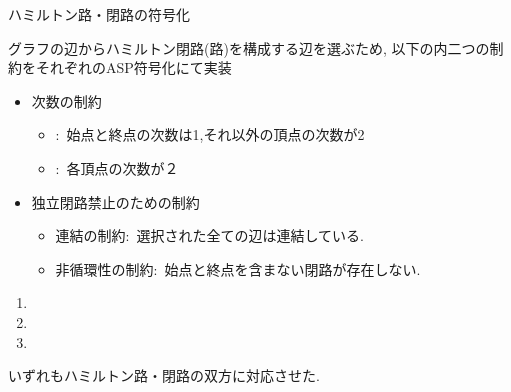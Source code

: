 \documentclass[dvipdfmx,11pt]{beamer}
\begin{document}
\begin{frame}[fragile]{ハミルトン路・閉路の符号化}
  \begin{block}{}
    グラフの辺からハミルトン閉路(路)を構成する辺を選ぶため,
    以下の内二つの制約をそれぞれのASP符号化にて実装
    \begin{itemize}
    \item \small{\alert{次数の制約}}
      \begin{itemize}
      \item \small{:\ 始点と終点の次数は1,それ以外の頂点の次数が2}        
      \item \small{:\ 各頂点の次数が２}
      \end{itemize}
    \item \small{独立閉路禁止のための制約}
      \begin{itemize}
      \item \small{\alert{連結の制約}:\ 選択された全ての辺は連結している.}
      \item \small{\alert{非循環性の制約}:\ 始点と終点を含まない閉路が存在しない.}
      \end{itemize}
    \end{itemize}
  \end{block}
  \begin{enumerate}
  \item {}
  \item {}
  \item {}
  \end{enumerate}
  いずれもハミルトン路・閉路の双方に対応させた.
\end{frame}
\newcommand{\grid}[2]{
    \draw (#1,#2) [fill=blue!20] circle[radius=0.5] node[at={(#1,#2)}]{1};
    \draw (#1,#2) circle[radius=0.5,shift={(1.5,0)}] node[at={(#1,#2)},shift={(1.5,0)}]{2};
    \draw (#1,#2) circle[radius=0.5,shift={(3.0,0)}] node[at={(#1,#2)},shift={(3.0,0)}]{3};
    \draw (#1,#2) circle[radius=0.5,shift={(0,-1.5)}] node[at={(#1,#2)},shift={(0,-1.5)}]{4};
    \draw (#1,#2) circle[radius=0.5,shift={(1.5,-1.5)}] node[at={(#1,#2)},shift={(1.5,-1.5)}]{5};
    \draw (#1,#2) circle[radius=0.5,shift={(3.0,-1.5)}] node[at={(#1,#2)},shift={(3.0,-1.5)}]{6};
    \draw (#1,#2) circle[radius=0.5,shift={(0,-3)}] node[at={(#1,#2)},shift={(0,-3)}]{7};
    \draw (#1,#2) circle[radius=0.5,shift={(1.5,-3)}] node[at={(#1,#2)},shift={(1.5,-3)}]{8};
    \draw (#1,#2) [fill=red!20] circle[radius=0.5,shift={(3.0,-3)}] node[at={(#1,#2)},shift={(3.0,-3)}]{9};
}
\end{document}
